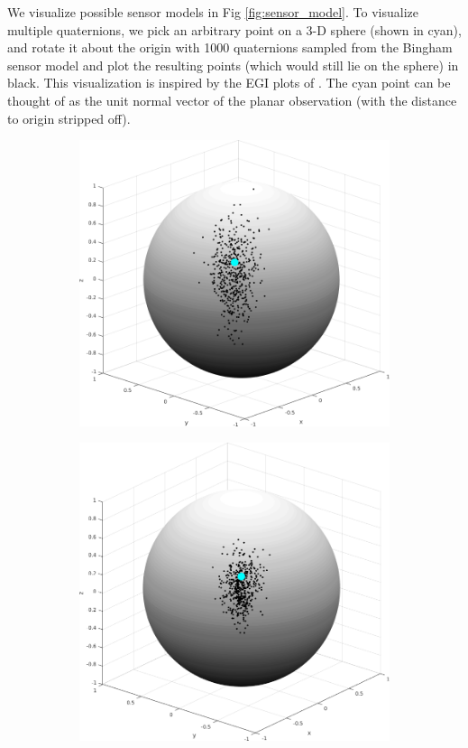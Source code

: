 \documentclass[12pt]{article}
\begin{document}
We visualize possible sensor models in Fig \ref{fig:sensor_model}. 
To visualize multiple quaternions, we pick an arbitrary point on a 3-D sphere (shown in cyan), and rotate it about the origin with 1000 quaternions sampled from the Bingham sensor model and plot the resulting points (which would still lie on the sphere) in black. 
This visualization is inspired by the EGI plots of \cite{riedel2016multi}. 
The cyan point can be thought of as the unit normal vector of the planar observation (with the distance to origin stripped off). 

\begin{figure}[H]
\centering
\begin{subfigure}{.3\textwidth}
  \centering
    \includegraphics[width=\linewidth]{sensor_model_30_30_600}
\end{subfigure}%
\begin{subfigure}{.3\textwidth}
  \centering
    \includegraphics[width=\linewidth]{sensor_model_60_60_900}

\end{subfigure}
\end{figure}
\end{document}
